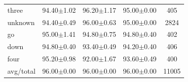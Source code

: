 \documentclass{beamer}
\begin{document}
{\begin{table}
\begin{tabular}{lcccc}
		three     &  94.40$\pm$1.02 &  96.20$\pm$1.17 &  95.00$\pm$0.00 &     405 \\
		unknown   &  94.40$\pm$0.49 &  96.00$\pm$0.63 &  95.00$\pm$0.00 &    2824 \\
		go        &  95.00$\pm$1.41 &  94.80$\pm$0.75 &  94.80$\pm$0.40 &     402 \\
		down      &  94.80$\pm$0.40 &  93.40$\pm$0.49 &  94.20$\pm$0.40 &     406 \\
		four      &  95.20$\pm$0.98 &  92.00$\pm$1.67 &  93.60$\pm$0.49 &     400 \\
		\midrule avg/total &  96.00$\pm$0.00 &  96.00$\pm$0.00 &  96.00$\pm$0.00 &   11005 \\
		\bottomrule
	\end{tabular}

\end{table}
}

\end{document}
